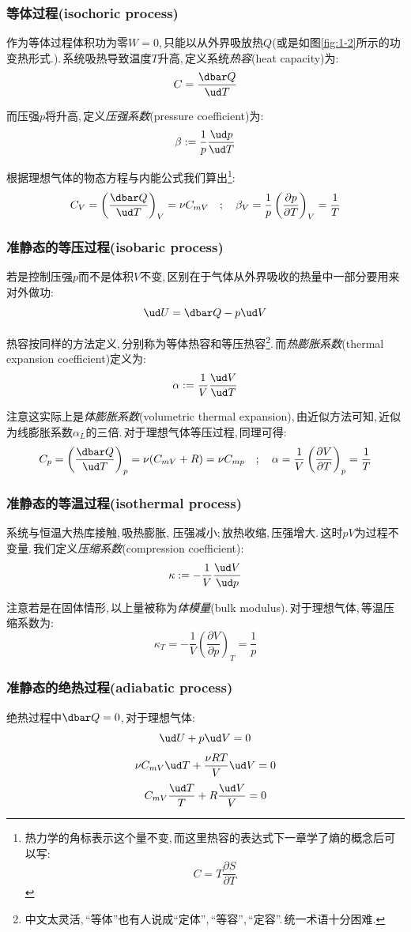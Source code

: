 \subsubsection{\hei 等体过程(isochoric process)}
作为等体过程体积功为零$W=0$,\,只能以从外界吸放热$Q$(或是如图\ref{fig:1-2}所示的功变热形式.).\,系统吸热导致温度$T$升高,\,定义系统\emph{热容}(heat capacity)为:
\[C=\frac{\dbar Q}{\ud T}\]

而压强$p$将升高,\,定义\emph{压强系数}(pressure coefficient)为:
\[\beta:=\frac{1}{p}\frac{\ud p}{\ud T}\]

根据理想气体的物态方程与内能公式我们算出\footnote{热力学的角标表示这个量不变,\,而这里热容的表达式下一章学了熵的概念后可以写:\[C=T\frac{\partial S}{\partial T}\]}:
\[C_V=\left(\frac{\dbar Q}{\ud T}\right)_V=\nu C_{mV} \quad ; \quad \beta_V=\frac{1}{p}\left(\frac{\partial p}{\partial T}\right)_V=\frac{1}{T}\]

\subsubsection{\hei 准静态的等压过程(isobaric process)}
若是控制压强$p$而不是体积$V$不变,\,区别在于气体从外界吸收的热量中一部分要用来对外做功:
\[\ud U=\dbar Q-p\ud V\]

热容按同样的方法定义,\,分别称为等体热容和等压热容\footnote{中文太灵活,\,``等体''也有人说成``定体'',\,``等容'',\,``定容''.\,统一术语十分困难.}.\,而\emph{热膨胀系数}(thermal expansion coefficient)定义为:
\[\alpha:=\frac{1}{V}\frac{\ud V}{\ud T}\]

注意这实际上是\emph{体膨胀系数}(volumetric thermal expansion),\,由近似方法可知,\,近似为线膨胀系数$\alpha_L$的三倍.\,对于理想气体等压过程,\,同理可得:
\[C_p=\left(\frac{\dbar Q}{\ud T}\right)_p=\nu (C_{mV}+R)=\nu C_{mp} \quad ; \quad \alpha=\frac{1}{V}\left(\frac{\partial V}{\partial T}\right)_p=\frac{1}{T}\]

\subsubsection{\hei 准静态的等温过程(isothermal process)}
系统与恒温大热库接触,\,吸热膨胀, 压强减小;\,放热收缩,\,压强增大.\,这时$pV$为过程不变量.\,我们定义\emph{压缩系数}(compression coefficient):
\[\kappa:=-\frac{1}{V}\frac{\ud V}{\ud p}\]

注意若是在固体情形,\,以上量被称为\emph{体模量}(bulk modulus).\,对于理想气体,\,等温压缩系数为:
\[\kappa_T=-\frac{1}{V}\left(\frac{\partial V}{\partial p}\right)_T=\frac{1}{p}\]

\subsubsection{\hei 准静态的绝热过程(adiabatic process)}
绝热过程中$\dbar Q=0$,\,对于理想气体:
\[\ud U +p \ud V=0\]
\[\nu C_{mV} \ud T + \frac{\nu R T}{V}\ud V=0\]
\[C_{mV}\frac{\ud T}{T}+R\frac{\ud V}{V}=0\]

